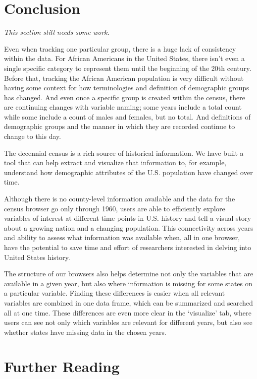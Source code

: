 \documentclass[DIV=calc, paper=a4, fontsize=10pt, twocolumn]{scrartcl}\usepackage[]{graphicx}\usepackage[]{color}
\begin{document}
\section*{Conclusion}

\par \textit{This section still needs some work.}

\par Even when tracking one particular group, there is a huge lack of consistency within the data. For African Americans in the United States, there isn't even a single specific category to represent them until the beginning of the 20th century. Before that, tracking the African American population is very difficult without having some context for how terminologies and definition of demographic groups has changed. And even once a specific group is created within the census, there are continuing changes with variable naming; some years include a total count while some include a count of males and females, but no total. And definitions of demographic groups and the manner in which they are recorded continue to change to this day. 

\par The decennial census is a rich source of historical information. We have built a tool that can help extract and visualize that information to, for example, understand how demographic attributes of the U.S. population have changed over time.

\par Although there is no county-level information available and the data for the census browser go only through 1960, users are able to efficiently explore variables of interest at different time points in U.S. history and tell a visual story about a growing nation and a changing population. This connectivity across years and ability to assess what information was available when, all in one browser, have the potential to save time and effort of researchers interested in delving into United States history.

\par The structure of our browsers also helps determine not only the variables that are available in a given year, but also where information is missing for some states on a particular variable. Finding these differences is easier when all relevant variables are combined in one data frame, which can be summarized and searched all at one time. These differences are even more clear in the `visualize' tab, where users can see not only which variables are relevant for different years, but also see whether states have missing data in the chosen years.  




\section*{Further Reading}


\end{document}
